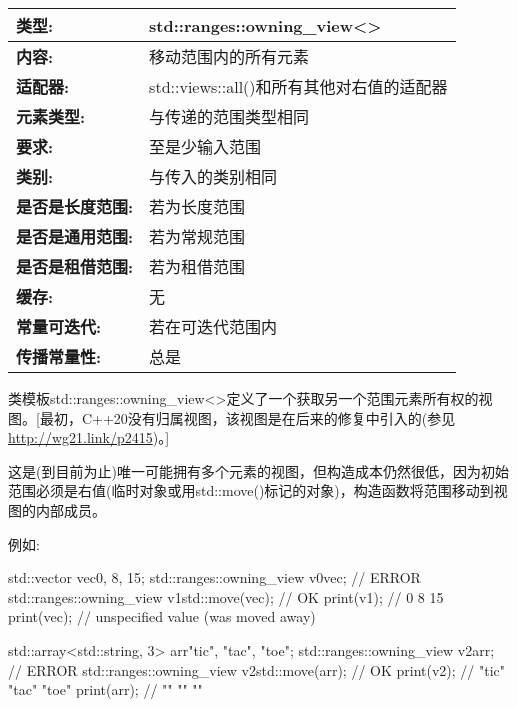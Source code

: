 \begin{longtable}[c]{|l|l|}
\hline
\textbf{类型:}                 & std::ranges::owning\_view\textless{}\textgreater{}  \\ \hline
\endfirsthead
%
\endhead
%
\textbf{内容:}              & 移动范围内的所有元素                       \\ \hline
\textbf{适配器:}             & std::views::all()和所有其他对右值的适配器 \\ \hline
\textbf{元素类型:}         & 与传递的范围类型相同                           \\ \hline
\textbf{要求:}             & 至是少输入范围                                \\ \hline
\textbf{类别:}             & 与传入的类别相同                                      \\ \hline
\textbf{是否是长度范围:}       & 若为长度范围                                  \\ \hline
\textbf{是否是通用范围:}      & 若为常规范围                                   \\ \hline
\textbf{是否是租借范围:}    & 若为租借范围                                \\ \hline
\textbf{缓存:}               & 无                                             \\ \hline
\textbf{常量可迭代:}       & 若在可迭代范围内                          \\ \hline
\textbf{传播常量性:} & 总是                                              \\ \hline
\end{longtable}

类模板std::ranges::owning\_view<>定义了一个获取另一个范围元素所有权的视图。[最初，C++20没有归属视图，该视图是在后来的修复中引入的(参见\url{http://wg21.link/p2415})。]

这是(到目前为止)唯一可能拥有多个元素的视图，但构造成本仍然很低，因为初始范围必须是右值(临时对象或用std::move()标记的对象)，构造函数将范围移动到视图的内部成员。

例如:

\begin{cpp}
std::vector vec{0, 8, 15};
std::ranges::owning_view v0{vec}; // ERROR
std::ranges::owning_view v1{std::move(vec)}; // OK
print(v1); // 0 8 15
print(vec); // unspecified value (was moved away)

std::array<std::string, 3> arr{"tic", "tac", "toe"};
std::ranges::owning_view v2{arr}; // ERROR
std::ranges::owning_view v2{std::move(arr)}; // OK
print(v2); // "tic" "tac" "toe"
print(arr); // "" "" ""
\end{cpp}

